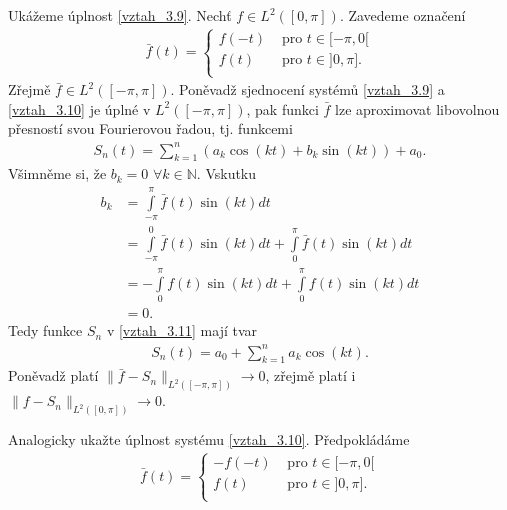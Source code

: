 Ukážeme úplnost \eqref{vztah_3.9}. Nechť $f \in L^2([ 0, \pi])$. Zavedeme označení
\begin{align*}
\bar{f} (t) = 
\left\{
\begin{array}{cl}
f(-t) & \textrm{ pro } t \in [ -\pi, 0[\\
f(t) & \textrm{ pro } t \in ] 0, \pi].\\
\end{array}
\right.
\end{align*}
Zřejmě $\bar{f} \in  L^2([ -\pi, \pi])$. Poněvadž sjednocení systém\r u \eqref{vztah_3.9} a \eqref{vztah_3.10} je úplné v $L^2([ -\pi, \pi])$, pak funkci $\bar{f}$ lze aproximovat libovolnou přesností svou Fourierovou řadou, tj. funkcemi
\begin{align}\label{vztah_3.11}
S_n (t) = \sum \limits _{k=1}^n (a_k \cos ( kt) + b_k \sin (kt)) + a_0.
\end{align}
Všimněme si, že $b_k = 0$ $\forall k \in \mathbb{N}$. Vskutku
\begin{align*}
b_k&=\int \limits_{-\pi}^\pi \bar{f}(t) \sin (kt) dt \\
&= \int \limits_{-\pi}^0 \bar{f}(t) \sin (kt) dt + \int \limits_0^\pi \bar{f}(t) \sin (kt) dt\\
&= - \int \limits_0^\pi f(t) \sin (kt) dt + \int \limits_0^\pi f(t) \sin (kt) dt\\
&= 0.
\end{align*}
Tedy funkce $S_n$ v \eqref{vztah_3.11} mají tvar
\begin{align*}
S_n(t) = a_0 + \sum \limits _{k=1}^n a_k \cos (kt).
\end{align*}
Poněvadž platí $\| \bar{f} - S_n \|_{L^2([ -\pi, \pi])} \rightarrow 0$, zřejmě platí i $\| f - S_n \|_{L^2([ 0, \pi])} \rightarrow 0$. 

\begin{uloha}
Analogicky ukažte úplnost systému \eqref{vztah_3.10}. Předpokládáme
\begin{align*}
\bar{f} (t) = 
\left\{
\begin{array}{cl}
-f(-t) & \textrm{ pro } t \in [ -\pi, 0[\\
f(t) & \textrm{ pro } t \in ] 0, \pi].\\
\end{array}
\right.
\end{align*}
\end{uloha}



